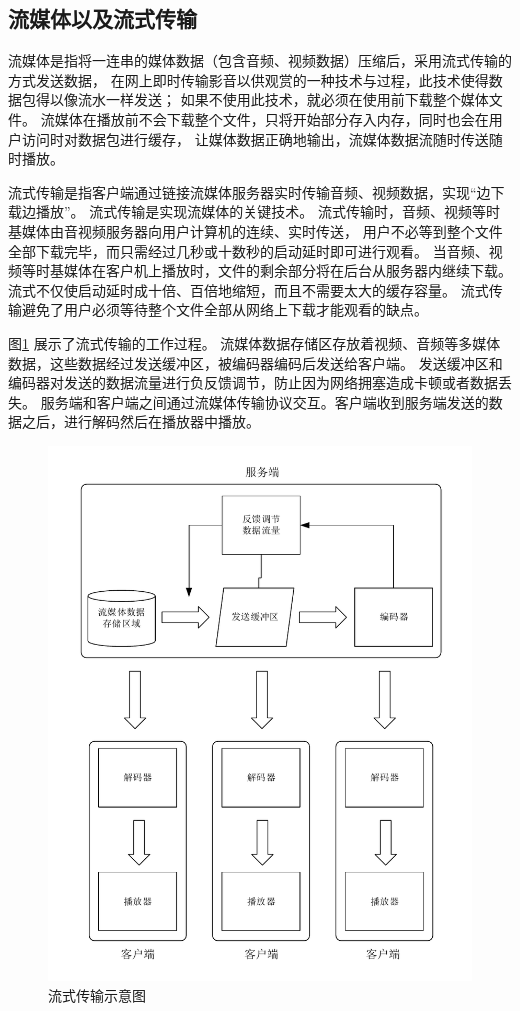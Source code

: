 \subsection{流媒体以及流式传输}
流媒体是指将一连串的媒体数据（包含音频、视频数据）压缩后，采用流式传输的方式发送数据，
在网上即时传输影音以供观赏的一种技术与过程，此技术使得数据包得以像流水一样发送；
如果不使用此技术，就必须在使用前下载整个媒体文件。
流媒体在播放前不会下载整个文件，只将开始部分存入内存，同时也会在用户访问时对数据包进行缓存，
让媒体数据正确地输出，流媒体数据流随时传送随时播放。

流式传输是指客户端通过链接流媒体服务器实时传输音频、视频数据，实现“边下载边播放”。
流式传输是实现流媒体的关键技术。
流式传输时，音频、视频等时基媒体由音视频服务器向用户计算机的连续、实时传送，
用户不必等到整个文件全部下载完毕，而只需经过几秒或十数秒的启动延时即可进行观看。
当音频、视频等时基媒体在客户机上播放时，文件的剩余部分将在后台从服务器内继续下载。
流式不仅使启动延时成十倍、百倍地缩短，而且不需要太大的缓存容量。
流式传输避免了用户必须等待整个文件全部从网络上下载才能观看的缺点。

\newpage
图\ref{Fig:server} 展示了流式传输的工作过程。
流媒体数据存储区存放着视频、音频等多媒体数据，这些数据经过发送缓冲区，被编码器编码后发送给客户端。
发送缓冲区和编码器对发送的数据流量进行负反馈调节，防止因为网络拥塞造成卡顿或者数据丢失。
服务端和客户端之间通过流媒体传输协议交互。客户端收到服务端发送的数据之后，进行解码然后在播放器中播放。

\begin{figure}[ht]
    \centering
    \includegraphics[scale=.8]{./Figure/IMG_server.pdf}
    \caption{流式传输示意图}
    \label{Fig:server}
\end{figure}

